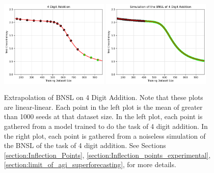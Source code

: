 \documentclass{article} %
\begin{document}
\begin{figure}[htbp]
    \centering


\includegraphics[width=0.48\textwidth]{figures/arithmetic/4_digit_addition__dataset_size.png}
\includegraphics[width=0.48\textwidth]{figures/arithmetic/4_digit_addition__dataset_size__very_first_version__simulation_limit.png}

    \caption{
    Extrapolation of BNSL on 4 Digit Addition. Note that these plots are linear-linear. Each point in the left plot is the mean of greater than 1000 seeds at that dataset size. In the left plot, each point is gathered from a model trained to do the task of 4 digit addition. In the right plot, each point is gathered from a noiseless simulation of the BNSL of the task of 4 digit addition. See Sections \ref{section:Inflection_Points}, \ref{section:Inflection_points_experimental}, \ref{section:limit_of_agi_superforecasting}, for more details.
    }
    \label{fig:arithmetic}
\end{figure}

\vspace{-1.8mm}
\end{document}
